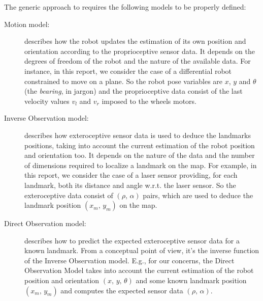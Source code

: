 The generic approach to \SLAM{} requires the following models to be properly defined: 
\begin{description}
	\item[Motion model:] describes how the robot updates the estimation of its own position and orientation according to the proprioceptive sensor data. 
	It depends on the degrees of freedom of the robot and the nature of the available data. 
	For instance, in this report, we consider the case of a differential robot constrained to move on a plane. 
	So the robot pose variables are $x$, $y$ and $\theta$ (the \emph{bearing}, in jargon) and the proprioceptive data consist of the last velocity values $v_l$ and $v_r$ imposed to the wheels motors.

	\item[Inverse Observation model:] describes how exteroceptive sensor data is used to deduce the landmarks positions, taking into account the current estimation of the robot position and orientation too.
	It depends on the nature of the data and the number of dimensions required to localize a landmark on the map.
	For example, in this report, we consider the case of a laser sensor providing, for each landmark, both its distance and angle w.r.t. the laser sensor.
	So the exteroceptive data consist of $(\rho,\, \alpha)$ pairs, which are used to deduce the landmark position $(x_m,\, y_m)$ on the map.
	
	\item[Direct Observation model:] describes how to predict the expected exteroceptive sensor data for a known landmark.
	From a conceptual point of view, it's the inverse function of the Inverse Observation model. 
	E.g., for our concerns, the Direct Observation Model takes into account the current estimation of the robot position and orientation $(x,\, y,\, \theta)$ and some known landmark position $(x_m,\, y_m)$ and computes the expected sensor data $(\rho,\, \alpha)$.
\end{description}